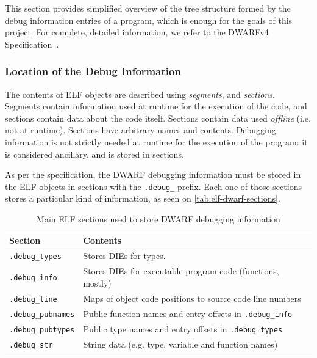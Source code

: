 This section provides simplified overview of the tree structure formed by the
debug information entries of a program, which is enough for the goals of this
project. For complete, detailed information, we refer to the DWARFv4
Specification~\cite{dwardspecv4}.


\subsubsection{Location of the Debug Information}

The contents of \gls{ELF} objects are described using \emph{segments}, and
\emph{sections}. Segments contain information used at runtime for the
execution of the code, and sections contain data about the code itself.
Sections contain data used \emph{offline} (i.e. not at runtime). Sections have
arbitrary names and contents. Debugging information is not strictly needed at
runtime for the execution of the program: it is considered ancillary, and is
stored in sections.

As per the specification, the DWARF debugging information must be stored in
the ELF objects in sections with the \verb|.debug_| prefix. Each one of those
sections stores a particular kind of information, as seen on
\autoref{tab:elf-dwarf-sections}. 


\begin{table}
  \centering\small
  \begin{tabular}{lp{}}
    \toprule
    Section & Contents \\
    \midrule
    \verb|.debug_types| & Stores DIEs for types. \\
    \verb|.debug_info| & Stores DIEs for executable program code (functions, mostly) \\
    \verb|.debug_line| & Maps of object code positions to source code line numbers \\
    \verb|.debug_pubnames| & Public function names and entry offsets in \verb|.debug_info| \\
    \verb|.debug_pubtypes| & Public type names and entry offsets in \verb|.debug_types| \\
    \verb|.debug_str| & String data (e.g. type, variable and function names) \\
    \bottomrule
  \end{tabular}
  \caption{Main ELF sections used to store DWARF debugging information}
  \label{tab:elf-dwarf-sections}
\end{table}


